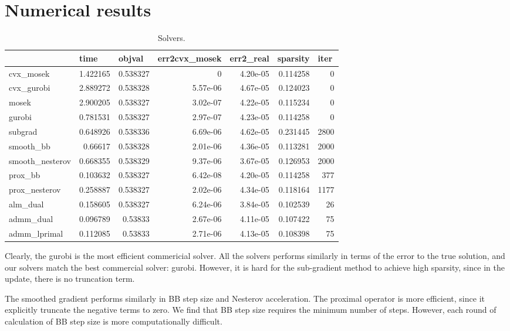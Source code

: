 \documentclass{article}
\numberwithin{equation}{section}
\numberwithin{figure}{section}
\begin{document}
\section{Numerical results}
\begin{table}[htbp]
  \centering
  \caption{Solvers.}
\begin{tabular}{lrrrrrr}
\toprule
      & \multicolumn{1}{l}{time} & \multicolumn{1}{l}{objval} & \multicolumn{1}{l}{err2cvx\_mosek} & \multicolumn{1}{l}{err2\_real} & \multicolumn{1}{l}{sparsity} & \multicolumn{1}{l}{iter} \\
      \midrule
cvx\_mosek & 1.422165 & 0.538327 & 0     & 4.20e-05 & 0.114258 & 0 \\
cvx\_gurobi & 2.889272 & 0.538328 & 5.57e-06 & 4.67e-05 & 0.124023 & 0 \\
mosek & 2.900205 & 0.538327 & 3.02e-07 & 4.22e-05 & 0.115234 & 0 \\
gurobi & 0.781531 & 0.538327 & 2.97e-07 & 4.23e-05 & 0.114258 & 0 \\
subgrad & 0.648926 & 0.538336 & 6.69e-06 & 4.62e-05 & 0.231445 & 2800 \\
smooth\_bb & 0.66617 & 0.538328 & 2.01e-06 & 4.36e-05 & 0.113281 & 2000 \\
smooth\_nesterov & 0.668355 & 0.538329 & 9.37e-06 & 3.67e-05 & 0.126953 & 2000 \\
prox\_bb & 0.103632 & 0.538327 & 6.42e-08 & 4.20e-05 & 0.114258 & 377 \\
prox\_nesterov & 0.258887 & 0.538327 & 2.02e-06 & 4.34e-05 & 0.118164 & 1177 \\
alm\_dual & 0.158605 & 0.538327 & 6.24e-06 & 3.84e-05 & 0.102539 & 26 \\
admm\_dual & 0.096789 & 0.53833 & 2.67e-06 & 4.11e-05 & 0.107422 & 75 \\
admm\_lprimal & 0.112085 & 0.53833 & 2.71e-06 & 4.13e-05 & 0.108398 & 75 \\
\bottomrule
\end{tabular}%
    \label{tab:hw1}%
\end{table}%
Clearly, the gurobi is the most efficient commericial solver. All the solvers performs similarly in terms of the error to the true solution, and our solvers match the best commercial solver: gurobi. However, it is hard for the sub-gradient method to achieve high sparsity, since in the update, there is no truncation term.

The smoothed gradient performs similarly in BB step size and Nesterov acceleration. The proximal operator is more efficient, since it explicitly truncate the negative terms to zero. We find that BB step size requires the minimum number of steps. However, each round of calculation of BB step size is more computationally difficult.
\end{document}
